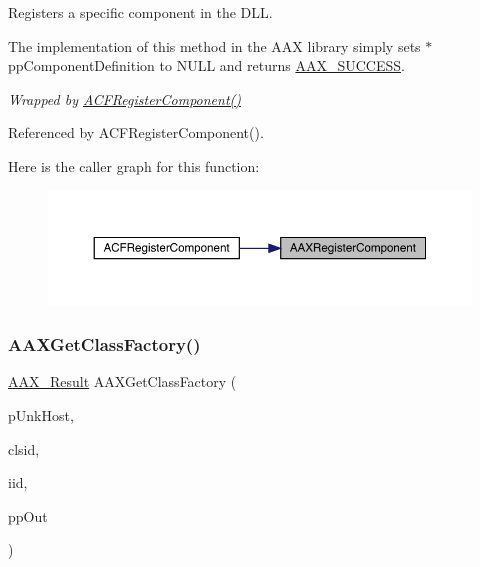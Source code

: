 Registers a specific component in the D\+LL. 

The implementation of this method in the A\+AX library simply sets {\ttfamily $\ast$pp\+Component\+Definition} to N\+U\+LL and returns \mbox{\hyperlink{a00494_a5f8c7439f3a706c4f8315a9609811937aeddbd1bb67e3a66e6af54a4b4a7a57b3}{A\+A\+X\+\_\+\+S\+U\+C\+C\+E\+SS}}.

{\itshape Wrapped by \mbox{\hyperlink{a00500_a68950ea83fea9b46b8f3fef409355b71}{A\+C\+F\+Register\+Component()}} } 

Referenced by A\+C\+F\+Register\+Component().

Here is the caller graph for this function\+:
\nopagebreak
\begin{figure}[H]
\begin{center}
\leavevmode
\includegraphics[width=350pt]{a00617_a03c71f96fcf624bf50b7acbe31a846f0_icgraph}
\end{center}
\end{figure}
\mbox{\label{a00617_a84cf37211a57dbaec9e7d077dd171798}} 
\subsubsection{\texorpdfstring{AAXGetClassFactory()}{AAXGetClassFactory()}}
{\footnotesize\ttfamily \mbox{\hyperlink{a00392_a4d8f69a697df7f70c3a8e9b8ee130d2f}{A\+A\+X\+\_\+\+Result}} A\+A\+X\+Get\+Class\+Factory (\begin{DoxyParamCaption}\item[{\mbox{\hyperlink{a01409}{I\+A\+C\+F\+Unknown}} $\ast$}]{p\+Unk\+Host,  }\item[{const acf\+C\+L\+S\+ID \&}]{clsid,  }\item[{const \mbox{\hyperlink{a00269_a59df0b41744eee7a066787aaedf97f67}{acf\+I\+ID}} \&}]{iid,  }\item[{void $\ast$$\ast$}]{pp\+Out }\end{DoxyParamCaption})}




